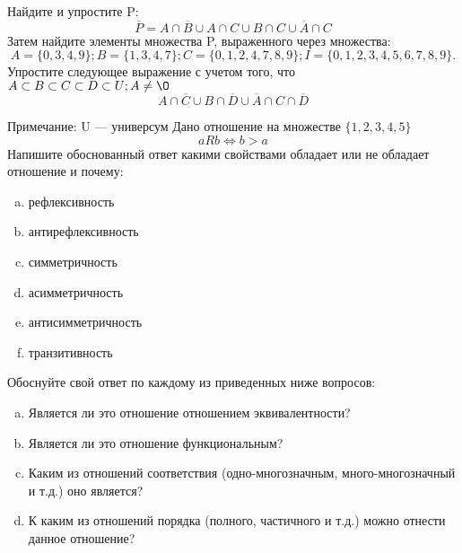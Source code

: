 \documentclass[10pt]{exam}
\begin{document}
\begin{questions}
\question
Найдите и упростите P:
\begin{equation*}
\overline{P} = A \cap \overline{B} \cup A \cap C \cup B \cap C \cup \overline{A} \cap C
\end{equation*}
Затем найдите элементы множества P, выраженного через множества:
\begin{equation*}
A = \{0, 3, 4, 9\}; 
B = \{1, 3, 4, 7\};
C = \{0, 1, 2, 4, 7, 8, 9\};
I = \{0, 1, 2, 3, 4, 5, 6, 7, 8, 9\}.
\end{equation*}\question
Упростите следующее выражение с учетом того, что $A\subset B \subset C \subset D \subset U; A \neq \O$
\begin{equation*}
A \cap  \overline{C} \cup B \cap \overline{D} \cup  \overline{A} \cap C \cap  \overline{D}
\end{equation*}

Примечание: U — универсум\question
Дано отношение на множестве $\{1, 2, 3, 4, 5\}$ 
\begin{equation*}
aRb \iff b > a
\end{equation*}
Напишите обоснованный ответ какими свойствами обладает или не обладает отношение и почему:   
\begin{enumerate} [a)]\setcounter{enumi}{0}
\item рефлексивность
\item антирефлексивность
\item симметричность
\item асимметричность
\item антисимметричность
\item транзитивность
\end{enumerate}

Обоснуйте свой ответ по каждому из приведенных ниже вопросов:
\begin{enumerate} [a)]\setcounter{enumi}{0}
    \item Является ли это отношение отношением эквивалентности?
    \item Является ли это отношение функциональным?
    \item Каким из отношений соответствия (одно-многозначным, много-многозначный и т.д.) оно является?
    \item К каким из отношений порядка (полного, частичного и т.д.) можно отнести данное отношение?
\end{enumerate}


\end{questions}
\end{document}
